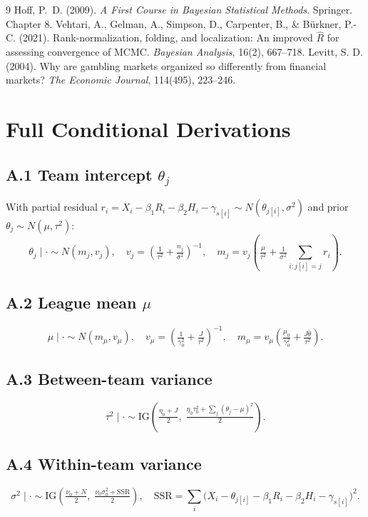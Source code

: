 \documentclass[11pt]{article}
\newcommand{\IG}{\mathrm{IG}}
\begin{document}
\begin{thebibliography}{9}
 Hoff, P.~D. (2009). \emph{A First Course in Bayesian
Statistical Methods}. Springer. Chapter 8.
 Vehtari, A., Gelman, A., Simpson, D., Carpenter, B., \&
Bürkner, P.-C. (2021). Rank-normalization, folding, and localization: An
improved $\hat R$ for assessing convergence of MCMC. \emph{Bayesian Analysis},
16(2), 667–718.
 Levitt, S. D. (2004). Why are gambling markets organized so
differently from financial markets? \emph{The Economic Journal}, 114(495),
223--246.
\end{thebibliography}

\appendix

\section{Full Conditional Derivations}\label{app:fc}

\subsection*{A.1 Team intercept $\theta_j$}
With partial residual $r_i = X_i - \beta_1 R_i - \beta_2 H_i - \gamma_{s[i]}
\sim N(\theta_{j[i]},\sigma^2)$ and prior $\theta_j \sim N(\mu,\tau^2)$:
\[
\theta_j \mid \cdot \sim N(m_j, v_j),\quad
v_j = \!\left(\tfrac{1}{\tau^2} + \tfrac{n_j}{\sigma^2}\right)^{-1},\quad
m_j = v_j\!\left(\tfrac{\mu}{\tau^2} + \tfrac{1}{\sigma^2}\!\sum_{i:j[i]=j}\! r_i\right).
\]

\subsection*{A.2 League mean $\mu$}
\[
\mu \mid \cdot \sim N(m_\mu, v_\mu),\quad
v_\mu = \!\left(\tfrac{1}{\gamma_0^2}+\tfrac{J}{\tau^2}\right)^{-1},\quad
m_\mu = v_\mu\!\left(\tfrac{\mu_0}{\gamma_0^2}+\tfrac{J\bar\theta}{\tau^2}\right).
\]

\subsection*{A.3 Between-team variance}
\[
\tau^2 \mid \cdot \sim \IG\!\left(\tfrac{\eta_0+J}{2},\;\tfrac{\eta_0\tau_0^2 + \sum_j(\theta_j-\mu)^2}{2}\right).
\]

\subsection*{A.4 Within-team variance}
\[
\sigma^2 \mid \cdot \sim \IG\!\left(\tfrac{\nu_0+N}{2},\;\tfrac{\nu_0\sigma_0^2 + \mathrm{SSR}}{2}\right),\quad
\mathrm{SSR} = \sum_i\!\bigl(X_i - \theta_{j[i]} - \beta_1 R_i - \beta_2 H_i - \gamma_{s[i]}\bigr)^2.
\]
\end{document}
